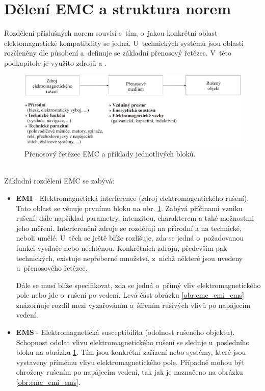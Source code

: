 \section{Dělení EMC a struktura norem}
Rozdělení příslušných norem souvisí s~tím, o~jakou konkrétní oblast elektomagnetické kompatibility se jedná. U~technických systémů jsou oblasti rozčleněny dle působení a~definuje se základní přenosový řetězec. V~této podkapitole je využito zdrojů \cite{nfr} a \cite{emc_encyklopedie}.
\begin{figure}[!h]
	\centering
	\includegraphics[width=14.6cm]{emc_retezec.png}
	\caption{Přenosový řetězec EMC a příklady jednotlivých bloků.}
	\label{obr:emc_retezec}
\end{figure}\\
Základní rozdělení EMC se zabývá:
\begin{itemize}
\item {\bf EMI} - Elektromagnetická interference (zdroj elektromagentického rušení). \\
Tato oblast se věnuje prvnímu bloku na obr. \ref{obr:emc_retezec}. Zabývá příčinami vzniku rušení, dále například parametry, intenzitou, charakterem a také možnostmi jeho měření. Interferenční zdroje se rozdělují na přírodní a na technické, neboli umělé. U~těch se ještě blíže rozlišuje, zda se jedná o~požadovanou funkci vysílače nebo nechtěnou. Konkrétních zdrojů, především pak technických, existuje nepřeberné množství, z~nichž některé jsou uvedeny u~přenosového řetězce.

Dále se musí blíže specifikovat, zda se jedná o~přímý vliv elektromagnetického pole nebo jde o~rušení po vedení. Levá část obrázku \ref{obr:emc_emi_ems} znázorňuje rozdíl mezi vyzařováním a~šířením rušivých vlivů po napájecím vedení.

\item {\bf EMS} - Elektromagnetická susceptibilita (odolnost rušeného objektu). \\
Schopnost odolat vlivu elektromagnetického rušení se sleduje u~posledního bloku na obrázku \ref{obr:emc_retezec}. Tím jsou konkrétní zařízení nebo systémy, které jsou vystaveny přímému vlivu elektromagnetického pole. Případně mohou být ohroženy rušením po napájecím vedení, tak jak je naznačeno na obrázku \ref{obr:emc_emi_ems}.
\end{itemize}
